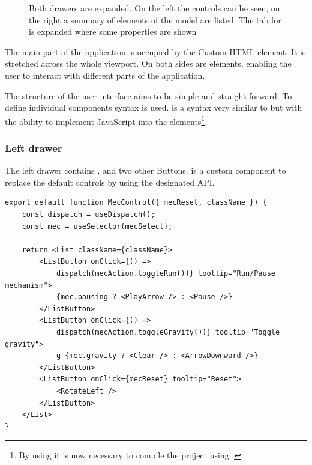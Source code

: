 \begin{figure}
    \centering
    \caption[Screenshot of the web application]{ Both drawers are expanded. On the left the  controls can be seen, on the right a summary of elements of the model are listed. The tab for  is expanded where some properties are shown }\label{fig:deepmech_klawr_de}
\end{figure}

The main part of the application is occupied by the  Custom HTML element.
It is stretched across the whole viewport.
On both sides are   elements, enabling the user to interact with different parts of the application.

The structure of the user interface aims to be simple and straight forward.
To define individual components   syntax is used.
 is a syntax very similar to  but with the ability to implement JavaScript into the elements\footnote{By using  it is now necessary to compile the project using .}. %

\subsubsection{Left drawer}

The left drawer contains ,  and two other Buttons.
 is a custom  component to replace the default  controls by using the designated API.\@

\begin{lstlisting}[label={lst:mec_control}, caption={Definition of the \name{MecControl} component.}]
export default function MecControl({ mecReset, className }) {
    const dispatch = useDispatch();
    const mec = useSelector(mecSelect);

    return <List className={className}>
        <ListButton onClick={() =>
            dispatch(mecAction.toggleRun())} tooltip="Run/Pause mechanism">
            {mec.pausing ? <PlayArrow /> : <Pause />}
        </ListButton>
        <ListButton onClick={() =>
            dispatch(mecAction.toggleGravity())} tooltip="Toggle gravity">
            g {mec.gravity ? <Clear /> : <ArrowDownward />}
        </ListButton>
        <ListButton onClick={mecReset} tooltip="Reset">
            <RotateLeft />
        </ListButton>
    </List>
}
\end{lstlisting}

